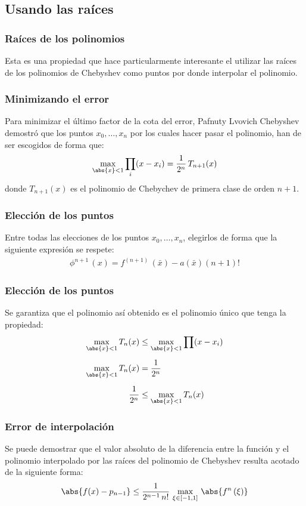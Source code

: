 \subsection{Usando las raíces}
\begin{frame}
\frametitle{Raíces de los polinomios}
Esta es una propiedad que hace particularmente interesante el utilizar las raíces de los polinomios de Chebyshev como puntos por donde interpolar el polinomio.
\end{frame}
\begin{frame}
\frametitle{Minimizando el error}
Para minimizar el último factor de la cota del error, Pafnuty Lvovich Chebyshev demostró que los puntos $x_{0}, \ldots, x_{n}$ por los cuales hacer pasar el polinomio, han de ser escogidos de forma que:
\begin{align*}
\max_{\abs{x}<1} \prod_{i} (x - x_{i}) = \dfrac{1}{2^{n}} \, T_{n+1} (x)
\end{align*}
donde $T_{n+1}(x)$ es el polinomio de Chebychev de primera clase de orden $n + 1$.
\end{frame}
\begin{frame}
\frametitle{Elección de los puntos}
Entre todas las elecciones de los puntos $x_{0}, \ldots, x_{n}$, elegirlos de forma que la siguiente expresión se respete:
\begin{align*}
\phi^{n+1} \, (x) = f^{(n+1)} \, (\bar{x}) - a (\bar{x}) (n + 1)!
\end{align*}
\end{frame}
\begin{frame}
\frametitle{Elección de los puntos}
Se garantiza que el polinomio así obtenido es el polinomio único que tenga la propiedad:
\begin{align*}
\max_{\abs{x}<1} T_{n} (x) &\leq \max_{\abs{x}<1} \prod (x - x_{i}) \\[0.5em]
\max_{\abs{x}<1} T_{n} (x) &= \dfrac{1}{2^{n}} \\[0.5em]
\dfrac{1}{2^{n}} &\leq \max_{\abs{x}<1} T_{n} (x)
\end{align*}
\end{frame}
\begin{frame}
\frametitle{Error de interpolación}
Se puede demostrar que el valor absoluto de la diferencia entre la función y el polinomio interpolado por las raíces del polinomio de Chebyshev resulta acotado de la siguiente forma:
\begin{align*}
\abs{f(x) - p_{n-1}} \leq \dfrac{1}{2^{n-1} \, n!} \, \max_{\xi \in [-1, 1]}  \, \abs{f^{n} \, (\xi)}
\end{align*}
\end{frame}
